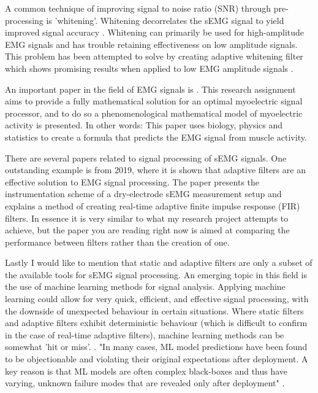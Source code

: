 A common technique of improving signal to noise ratio (SNR) through pre-processing is 'whitening'. Whitening decorrelates the sEMG signal to yield improved signal accuracy \cite{emg_whitening}. 
Whitening can primarily be used for high-amplitude EMG signals and has trouble retaining effectiveness on low amplitude signals. This problem has been attempted to solve by creating adaptive whitening filter which shows promising results when applied to low EMG amplitude signals \cite{adaptive_whitening}. 

An important paper in the field of EMG signals is \cite{optimal_myoprocessor}. This research assignment aims to provide a fully mathematical solution for an optimal myoelectric signal processor, and to do so a phenomenological mathematical model of myoelectric activity is presented. In other words: This paper uses biology, physics and statistics to create a formula that predicts the EMG signal from muscle activity.

There are several papers related to signal processing of sEMG signals.
One outstanding example is \cite{adaptive_filter_dry_electrode} from 2019, where it is shown that adaptive filters are an effective solution to EMG signal processing. The paper presents the instrumentation scheme of a dry-electrode sEMG measurement setup and explains a method of creating real-time adaptive finite impulse response (FIR) filters. In essence it is very similar to what my research project attempts to achieve, but the paper you are reading right now is aimed at comparing the performance between filters rather than the creation of one.

Lastly I would like to mention that static and adaptive filters are only a subset of the available tools for sEMG signal processing. An emerging topic in this field is the use of machine learning methods for signal analysis. Applying machine learning could allow for very quick, efficient, and effective signal processing, with the downside of unexpected behaviour in certain situations. Where static filters and adaptive filters exhibit deterministic behaviour (which is difficult to confirm in the case of real-time adaptive filters), machine learning methods can be somewhat 'hit or miss'. \cite{ml_semg_processing_1}.
\cite{ml_semg_processing_2}
"In many cases, ML model predictions have been found to be objectionable and violating their original expectations after deployment. A key reason is that ML models are often complex black-boxes and thus have varying, unknown failure modes that are revealed only after deployment" \cite{microsoft_machine_learning_reliable}.

